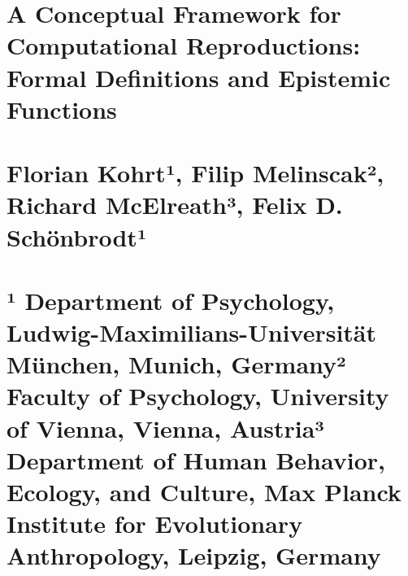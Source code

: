 \documentclass[authordate, empirical]{jote-new-article}
\begin{document}
\begin{frontmatter}
  \maketitle
  \begin{abstract}
    \printabstracttext
  \end{abstract}
\end{frontmatter}


	\section{\textbf{A Conceptual Framework for Computational Reproductions: Formal Definitions and Epistemic Functions}}



	\section{}



	\section{Florian Kohrt¹, Filip Melinscak², Richard McElreath³, Felix D. Schönbrodt¹}



	\section{¹ Department of Psychology, Ludwig-Maximilians-Universität München, Munich, Germany² Faculty of Psychology, University of Vienna, Vienna, Austria³ Department of Human Behavior, Ecology, and Culture, Max Planck Institute for Evolutionary Anthropology, Leipzig, Germany}



	\section{}



	\section{}



	\section{}
\end{document}
